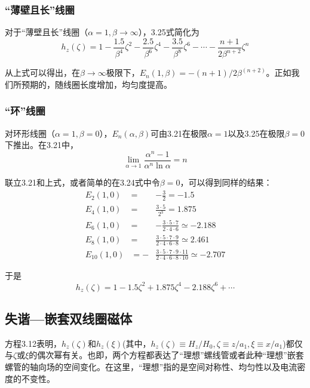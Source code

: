 \subsubsection{“薄壁且长”线圈}
对于“薄壁且长”线圈（$\alpha=1,\beta\rightarrow \infty$），3.25式简化为
\begin{equation}
  h_z(\zeta)=1-\frac{1.5}{\beta^4}\zeta^2-\frac{2.5}{\beta^6}\zeta^4-\frac{3.5}{\beta^8}\zeta^6-\cdots-\frac{n+1}{2\beta^{n+2}}\zeta^{n}
\end{equation}

从上式可以得出，在$\beta\rightarrow \infty$极限下，$E_n(1,\beta)=-(n+1)/2\beta^{(n+2)}$。正如我们所预期的，随线圈长度增加，均匀度提高。

\subsubsection{“环”线圈}
对环形线圈（$\alpha=1,\beta=0$），$E_n(\alpha,\beta)$可由3.21在极限$\alpha=1$以及3.25在极限$\beta=0$下推出。在3.21中，
\begin{equation}
  \lim_{\alpha\rightarrow 1}\frac{\alpha^n-1}{\alpha^n \ln\alpha}=n
\end{equation}

联立3.21和上式，或者简单的在3.24式中令$\beta=0$，可以得到同样的结果：
\begin{eqnarray}
  E_2(1,0) &=& -\frac{3}{2}=-1.5 \\ \nonumber
  E_4(1,0) &=& \frac{3\cdot 5}{2^3}=1.875 \\ \nonumber
    E_6(1,0) &=& -\frac{3\cdot 5 \cdot 7}{2\cdot 4\cdot 6}\simeq-2.188 \\ \nonumber
      E_8(1,0) &=&\frac{3\cdot 5 \cdot 7\cdot 9}{2\cdot 4\cdot 6\cdot 8}\simeq 2.461 \\ \nonumber
        E_{10}(1,0) &=-&\frac{3\cdot 5 \cdot 7\cdot 9\cdot 11}{2\cdot 4\cdot 6\cdot 8\cdot 10}\simeq -2.707
\end{eqnarray}

于是
\begin{equation}
  h_z(\zeta)=1-1.5\zeta^2+1.875\zeta^4-2.188\zeta^6+\cdots
\end{equation}

\subsection{失谐—嵌套双线圈磁体}
方程3.12表明，$h_z(\zeta)$和$h_z(\xi)$(其中，$h_z(\zeta)\equiv H_z/H_0,\zeta\equiv z/a_1,\xi\equiv x/a_1$)都仅与$\zeta$或$\xi$的偶次幂有关。也即，两个方程都表达了“理想”螺线管或者此种“理想”嵌套螺管的轴向场的空间变化。在这里，“理想”指的是空间对称性、均匀性以及电流密度的不变性。


